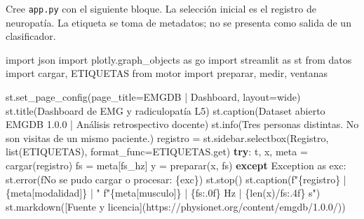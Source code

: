 \documentclass[
  spanish,
  10.5pt,
  a4paper,
  DIV=11,
  numbers=noendperiod]{scrartcl}
\newenvironment{Shaded}{\begin{snugshade}}{\end{snugshade}}
\newcommand{\BuiltInTok}[1]{\textcolor[rgb]{0.00,0.23,0.31}{#1}}
\newcommand{\ControlFlowTok}[1]{\textcolor[rgb]{0.00,0.23,0.31}{\textbf{#1}}}
\newcommand{\ImportTok}[1]{\textcolor[rgb]{0.00,0.46,0.62}{#1}}
\newcommand{\NormalTok}[1]{\textcolor[rgb]{0.00,0.23,0.31}{#1}}
\newcommand{\OperatorTok}[1]{\textcolor[rgb]{0.37,0.37,0.37}{#1}}
\newcommand{\PreprocessorTok}[1]{\textcolor[rgb]{0.68,0.00,0.00}{#1}}
\newcommand{\SpecialCharTok}[1]{\textcolor[rgb]{0.37,0.37,0.37}{#1}}
\newcommand{\SpecialStringTok}[1]{\textcolor[rgb]{0.13,0.47,0.30}{#1}}
\newcommand{\StringTok}[1]{\textcolor[rgb]{0.13,0.47,0.30}{#1}}
\begin{document}
Cree \texttt{app.py} con el siguiente bloque. La selección inicial es el
registro de neuropatía. La etiqueta se toma de metadatos; no se presenta
como salida de un clasificador.

\begin{Shaded}
\begin{Highlighting}[]
\ImportTok{import}\NormalTok{ json}
\ImportTok{import}\NormalTok{ plotly.graph\_objects }\ImportTok{as}\NormalTok{ go}
\ImportTok{import}\NormalTok{ streamlit }\ImportTok{as}\NormalTok{ st}
\ImportTok{from}\NormalTok{ datos }\ImportTok{import}\NormalTok{ cargar, ETIQUETAS}
\ImportTok{from}\NormalTok{ motor }\ImportTok{import}\NormalTok{ preparar, medir, ventanas}

\NormalTok{st.set\_page\_config(page\_title}\OperatorTok{=}\StringTok{\textquotesingle{}EMGDB | Dashboard\textquotesingle{}}\NormalTok{, layout}\OperatorTok{=}\StringTok{\textquotesingle{}wide\textquotesingle{}}\NormalTok{)}
\NormalTok{st.title(}\StringTok{\textquotesingle{}Dashboard de EMG y radiculopatía L5\textquotesingle{}}\NormalTok{)}
\NormalTok{st.caption(}\StringTok{\textquotesingle{}Dataset abierto EMGDB 1.0.0 | Análisis retrospectivo docente\textquotesingle{}}\NormalTok{)}
\NormalTok{st.info(}\StringTok{\textquotesingle{}Tres personas distintas. No son visitas de un mismo paciente.\textquotesingle{}}\NormalTok{)}
\NormalTok{registro }\OperatorTok{=}\NormalTok{ st.sidebar.selectbox(}\StringTok{\textquotesingle{}Registro\textquotesingle{}}\NormalTok{, }\BuiltInTok{list}\NormalTok{(ETIQUETAS),}
\NormalTok{                               format\_func}\OperatorTok{=}\NormalTok{ETIQUETAS.get)}
\ControlFlowTok{try}\NormalTok{:}
\NormalTok{    t, x, meta }\OperatorTok{=}\NormalTok{ cargar(registro)}
\NormalTok{    fs }\OperatorTok{=}\NormalTok{ meta[}\StringTok{\textquotesingle{}fs\_hz\textquotesingle{}}\NormalTok{]}
\NormalTok{    y }\OperatorTok{=}\NormalTok{ preparar(x, fs)}
\ControlFlowTok{except} \PreprocessorTok{Exception} \ImportTok{as}\NormalTok{ exc:}
\NormalTok{    st.error(}\SpecialStringTok{f\textquotesingle{}No se pudo cargar o procesar: }\SpecialCharTok{\{}\NormalTok{exc}\SpecialCharTok{\}}\SpecialStringTok{\textquotesingle{}}\NormalTok{)}
\NormalTok{    st.stop()}
\NormalTok{st.caption(}\SpecialStringTok{f"}\SpecialCharTok{\{}\NormalTok{registro}\SpecialCharTok{\}}\SpecialStringTok{ | }\SpecialCharTok{\{}\NormalTok{meta[}\StringTok{\textquotesingle{}modalidad\textquotesingle{}}\NormalTok{]}\SpecialCharTok{\}}\SpecialStringTok{ | "}
           \SpecialStringTok{f"}\SpecialCharTok{\{}\NormalTok{meta[}\StringTok{\textquotesingle{}musculo\textquotesingle{}}\NormalTok{]}\SpecialCharTok{\}}\SpecialStringTok{ | }\SpecialCharTok{\{}\NormalTok{fs}\SpecialCharTok{:.0f\}}\SpecialStringTok{ Hz | }\SpecialCharTok{\{}\BuiltInTok{len}\NormalTok{(x)}\OperatorTok{/}\NormalTok{fs}\SpecialCharTok{:.4f\}}\SpecialStringTok{ s"}\NormalTok{)}
\NormalTok{st.markdown(}\StringTok{\textquotesingle{}[Fuente y licencia](https://physionet.org/content/emgdb/1.0.0/)\textquotesingle{}}\NormalTok{)}
\end{Highlighting}
\end{Shaded}
\end{document}
